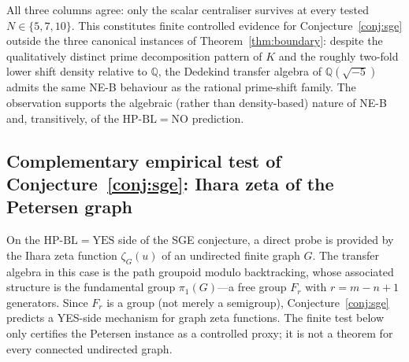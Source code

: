 \documentclass[11pt]{article}
\theoremstyle{definition}
\theoremstyle{remark}
\newcommand{\HBL}{\mathrm{HP\text{-}BL}}
\begin{document}
All three columns agree: only the scalar centraliser survives at
every tested $N \in \{5, 7, 10\}$. This constitutes finite
controlled evidence for Conjecture~\ref{conj:sge} outside the
three canonical instances of Theorem~\ref{thm:boundary}: despite the
qualitatively distinct prime decomposition pattern of $K$ and the
roughly two-fold lower shift density relative to $\mathbb{Q}$, the
Dedekind transfer algebra of $\mathbb{Q}(\sqrt{-5})$ admits the same
NE-B behaviour as the rational prime-shift family. The observation
supports the algebraic (rather than density-based) nature of NE-B
and, transitively, of the $\HBL = \mathrm{NO}$ prediction.

\subsection{Complementary empirical test of
Conjecture~\ref{conj:sge}: Ihara zeta of the Petersen graph}
\label{sec:sge-ihara-test}

On the $\HBL = \mathrm{YES}$ side of the SGE conjecture, a direct
probe is provided by the Ihara zeta function $\zeta_G(u)$ of an
undirected finite graph $G$. The transfer algebra in this case is the
path groupoid modulo backtracking, whose associated structure is the
fundamental group $\pi_1(G)$---a free group $F_r$ with $r = m - n + 1$
generators. Since $F_r$ is a group (not merely a semigroup),
Conjecture~\ref{conj:sge} predicts a YES-side mechanism for graph
zeta functions. The finite test below only certifies the Petersen
instance as a controlled proxy; it is not a theorem for every connected
undirected graph.
\end{document}
